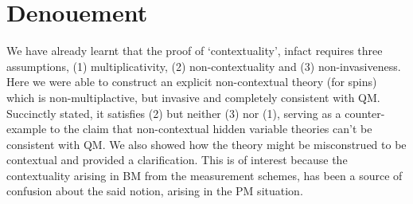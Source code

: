 \section{Denouement}

We have already learnt that the proof of `contextuality', infact requires
three assumptions, (1) multiplicativity, (2) non-contextuality and
(3) non-invasiveness. Here we were able to construct an explicit non-contextual
theory (for spins) which is non-multiplactive, but invasive and completely
consistent with QM. Succinctly stated, it satisfies (2) but neither
(3) nor (1), serving as a counter-example to the claim that non-contextual
hidden variable theories can't be consistent with QM. We also showed
how the theory might be misconstrued to be contextual and provided
a clarification. This is of interest because the contextuality arising
in BM from the measurement schemes, has been a source of confusion
about the said notion, arising in the PM situation.

